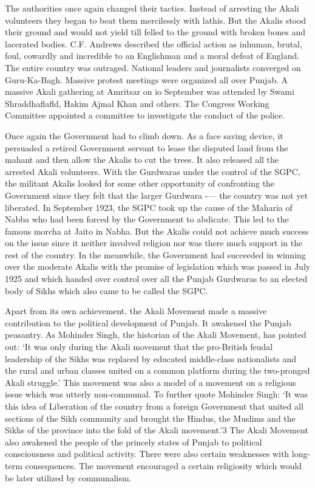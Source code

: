 The authorities once again changed their tactics. Instead of arresting the Akali volunteers they began to beat them mercilessly with lathis. But the Akalis stood their ground and would not yield till felled to the ground with broken bones and lacerated bodies. C.F. Andrews described the official action as inhuman, brutal, foul, cowardly and incredible to an Englishman and a moral defeat of England. The entire country was outraged. National leaders and journalists converged on Guru-Ka-Bagh. Massive protest meetings were organized all over Punjab. A massive Akali gathering at Amritsar on io September was attended by Swami Shraddhaflafld, Hakim Ajmal Khan and others. The Congress Working Committee appointed a committee to investigate the conduct of the police.

Once again the Government had to climb down. As a face saving device, it persuaded a retired Government servant to lease the disputed land from the mahant and then allow the Akalis to cut the trees. It also released all the arrested Akali volunteers. With the Gurdwaras under the control of the SGPC, the militant Akalis looked for some other opportunity of confronting the Government since they felt that the larger Gurdwara -— the country was not yet liberated. In September 1923, the SGPC took up the cause of the Maharia of Nabba who had been forced by the Government to abdicate. This led to the famous morcha at Jaito in Nabha. But the Akalis could not achieve much success on the issue since it neither involved religion nor was there much support in the rest of the country. In the meanwhile, the Government had succeeded in winning over the moderate Akalis with the promise of legislation which was passed in July 1925 and which handed over control over all the Punjab Gurdwaras to an elected body of Sikhs which also came to be called the SGPC.

Apart from its own achievement, the Akali Movement made a massive contribution to the political development of Punjab. It awakened the Punjab peasantry. As Mohinder Singh, the historian of the Akali Movement, has pointed out: ‘It was only during the Akali movement that the pro-British feudal leadership of the Sikhs was replaced by educated middle-class nationalists and the rural and urban classes united on a common platform during the two-pronged Akali struggle.’ This movement was also a model of a movement on a religious issue which was utterly non-communal. To further quote Mohinder Singh: ‘It was this idea of Liberation of the country from a foreign Government that united all sections of the Sikh community and brought the Hindus, the Muslims and the Sikhs of the province into the fold of the Akali movement.’3 The Akali Movement also awakened the people of the princely states of Punjab to political consciousness and political activity. There were also certain weaknesses with long-term consequences. The movement encouraged a certain religiosity which would be later utilized by communalism.

